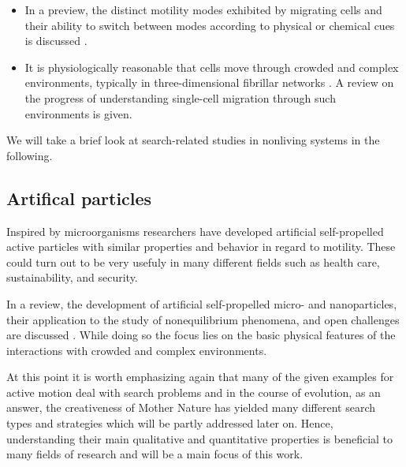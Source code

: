 \begin{itemize}
 \item %
 In a preview, the distinct motility modes exhibited by migrating cells and their ability to switch between modes according to physical or chemical cues is discussed \cite{welch:2015}.
 \item %
 It is physiologically reasonable that cells move through crowded and complex environments, typically in three-dimensional fibrillar networks \cite{mak:2016}. A review on the progress of understanding single-cell migration through such environments is given.
\end{itemize}
 We will take a brief look at search-related studies in nonliving systems in the following.
 
 \subsection*{Artifical particles}
 Inspired by microorganisms researchers have developed artificial self-propelled active particles with similar properties and behavior in regard to motility. These could turn out to be very usefuly in many different fields such as \eg health care, sustainability, and security.
 
 In a review, the development of artificial self-propelled micro- and nanoparticles, their application to the study of nonequilibrium phenomena, and open challenges are discussed \cite{bechinger:2016}. While doing so the focus lies on the basic physical features of the interactions with crowded and complex environments.
 
\bigskip
 
\noindent At this point it is worth emphasizing again that many of the given examples for active motion deal with search problems and in the course of evolution, as an answer, the creativeness of Mother Nature has yielded many different search types and strategies which will be partly addressed later on. Hence, understanding their main qualitative and quantitative properties is beneficial to many fields of research and will be a main focus of this work.



